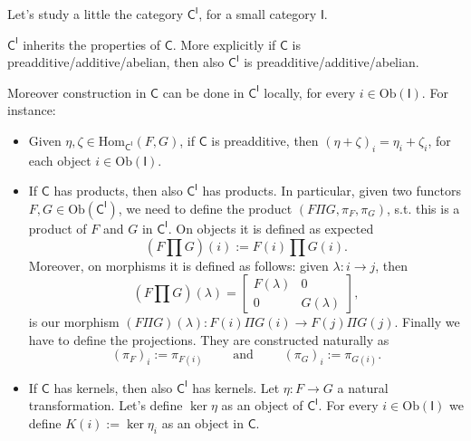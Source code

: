 Let's study a little the category $\mathsf{C}^{\mathsf{I}}$, for a small category $\mathsf{I}$.
\begin{prop}
	$\mathsf{C}^{\mathsf{I}}$ inherits the properties of $\mathsf{C}$.
	More explicitly if $\mathsf{C}$ is preadditive/additive/abelian, then also
	$\mathsf{C}^{\mathsf{I}}$ is preadditive/additive/abelian.
	
	Moreover construction in $\mathsf{C}$ can be done in $\mathsf{C}^{\mathsf{I}}$ locally, for every $i \in \mathrm{Ob} \left(\mathsf{I}\right)$.
	For instance:
	\begin{itemize}
		\item Given $\eta, \zeta \in \mathrm{Hom}_{\mathsf{C}^{\mathsf{I}}} \left( F, G \right)$, if $\mathsf{C}$ is preadditive, then
			$\left( \eta + \zeta \right)_i = \eta_i + \zeta_i$, for each object $i \in \mathrm{Ob} \left(\mathsf{I}\right)$.
		\item If $\mathsf{C}$ has products, then also $\mathsf{C}^{\mathsf{I}}$ has products.
			In particular, given two functors $F,G \in \mathrm{Ob} \left(\mathsf{C}^{\mathsf{I}}\right)$, we need to define the product
			$\left(F \Pi G, \pi_F, \pi_G\right)$, s.t. this is a product of $F$ and $G$ in $\mathsf{C}^{\mathsf{I}}$.
			On objects it is defined as expected
			\begin{equation}
				(F \prod G)(i) := F(i) \prod G(i)
			.\end{equation} 
			Moreover, on morphisms it is defined as follows: given $\lambda: i \to j$, then
			\begin{equation}
				\left( F \prod G \right)(\lambda) = 
				\begin{bmatrix}
					F(\lambda) & 0\\
					0 & G(\lambda)
				\end{bmatrix} 
			,\end{equation} 
			is our morphism $\left( F \Pi G \right)(\lambda): F(i) \Pi G(i) \to F(j) \Pi G(j)$.
			Finally we have to define the projections.
			They are constructed naturally as
			\begin{equation}
				(\pi_F)_i := \pi_{F(i)} \qquad \text{ and } \qquad \left( \pi_G \right)_i := \pi_{G(i)}
			.\end{equation} 
		\item If $\mathsf{C}$ has kernels, then also $\mathsf{C}^{\mathsf{I}}$ has kernels.
			Let $\eta: F \to G$ a natural transformation.
			Let's define $\ker \eta$ as an object of $\mathsf{C}^{\mathsf{I}}$.
			For every $i \in \mathrm{Ob} \left(\mathsf{I}\right)$ we define $K(i) := \ker \eta_i$ as an object in $\mathsf{C}$.

\end{itemize}
\end{prop}
